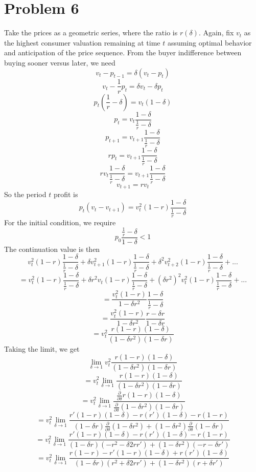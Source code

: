 \documentclass[10pt,letter]{article}
\begin{document}
\section*{Problem 6}
Take the prices as a geometric series, where the ratio is $r(\delta)$. Again, fix $v_t$ as the highest consumer valuation remaining at time $t$ assuming optimal behavior and anticipation of the price sequence. From the buyer indifference between buying sooner versus later, we need
\[ v_t - p_{t-1} = \delta(v_t - p_t) \]
\[ v_t - \frac{1}{r}p_t = \delta v_t - \delta p_t \]
\[ p_t \left( \frac{1}{r} - \delta \right)   =  v_t(1 - \delta) \]
\[ p_t  =  v_t\frac{1 - \delta}{\frac{1}{r} - \delta } \]
\[ p_{t+1}  =  v_{t+1}\frac{1 - \delta}{\frac{1}{r} - \delta } \]
\[ rp_t  =  v_{t+1}\frac{1 - \delta}{\frac{1}{r} - \delta } \]
\[ rv_t\frac{1 - \delta}{\frac{1}{r} - \delta }  =  v_{t+1}\frac{1 - \delta}{\frac{1}{r} - \delta } \]
\[ v_{t+1} = rv_t \]
So the period $t$ profit is
\[ p_t(v_t - v_{t+1}) = v_t^2 (1-r) \frac{1 - \delta}{\frac{1}{r} - \delta } \]
For the initial condition, we require
\[ p_0\frac{\frac{1}{r} - \delta }{1 - \delta} < 1 \]
The continuation value is then
\[ v_t^2 (1-r) \frac{1 - \delta}{\frac{1}{r} - \delta } + \delta v_{t+1}^2 (1-r) \frac{1 - \delta}{\frac{1}{r} - \delta } + \delta^2 v_{t+2}^2 (1-r) \frac{1 - \delta}{\frac{1}{r} - \delta } + ...\]
\[ = v_t^2 (1-r) \frac{1 - \delta}{\frac{1}{r} - \delta } + \delta r^2 v_{t} (1-r) \frac{1 - \delta}{\frac{1}{r} - \delta } + (\delta r^2)^2 v_{t}^2 (1-r) \frac{1 - \delta}{\frac{1}{r} - \delta } + ...\]
\[ = \frac{v_t^2 (1-r)}{1 - \delta r^2} \frac{1 - \delta}{\frac{1}{r} - \delta } \]
\[ = \frac{v_t^2 (1-r)}{1 - \delta r^2} \frac{r - \delta r}{1 - \delta r} \]
\[ = v_t^2  \frac{r (1-r)(1-\delta)}{(1 - \delta r^2)(1-\delta r)} \]
Taking the limit, we get
\[ \lim_{\delta \to 1} v_t^2  \frac{r (1-r)(1-\delta)}{(1 - \delta r^2)(1-\delta r)} \]
\[ = v_t^2 \lim_{\delta \to 1}   \frac{r (1-r)(1-\delta)}{(1 - \delta r^2)(1-\delta r)} \]
\[ = v_t^2 \lim_{\delta \to 1}   \frac{ \frac{\partial}{\partial \delta }r (1-r)(1-\delta)}{\frac{\partial}{\partial \delta }(1 - \delta r^2)(1-\delta r)} \]
\[ = v_t^2 \lim_{\delta \to 1}   \frac{ r' (1-r)(1-\delta) - r(r')(1-\delta) - r(1-r)}{(1-\delta r)\frac{\partial}{\partial \delta }(1 - \delta r^2) + (1 - \delta r^2)\frac{\partial}{\partial \delta }(1 - \delta r)} \]
\[ = v_t^2 \lim_{\delta \to 1}   \frac{ r' (1-r)(1-\delta) - r(r')(1-\delta) - r(1-r)}{(1-\delta r)(-  r^2 - \delta 2r r') + (1 - \delta r^2)(- r - \delta r')} \]
\[ = v_t^2 \lim_{\delta \to 1}   \frac{ r(1-r) - r' (1-r)(1-\delta) + r(r')(1-\delta) }{(1-\delta r)( r^2+ \delta 2r r') + (1 - \delta r^2)(r + \delta r')} \]
\end{document}
